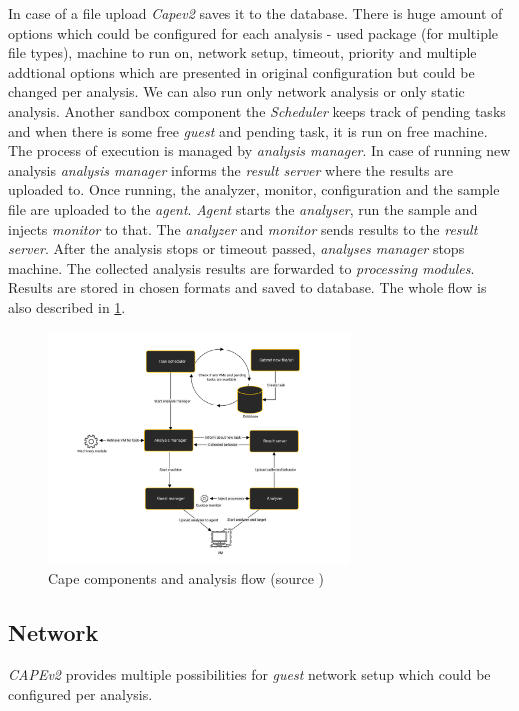 In case of a file upload \emph{Capev2} saves it to the database. There is huge amount of options which could be configured for each analysis - used package (for multiple file types), machine to run on, network setup, timeout, priority and multiple addtional options which are presented in original configuration but could be changed per analysis. We can also run only network analysis or only static analysis. Another sandbox component the \emph{Scheduler} keeps track of pending tasks and when there is some free \emph{guest} and pending task, it is run on free machine. The process of execution is managed by \emph{analysis manager}. In case of running new analysis \emph{analysis manager} informs the \emph{result server} where the results are uploaded to. Once running, the analyzer, monitor, configuration and the sample file are uploaded to the \emph{agent}. \emph{Agent} starts the \emph{analyser}, run the sample and injects \emph{monitor} to that. The \emph{analyzer} and \emph{monitor} sends results to the \emph{result server}. After the analysis stops or timeout passed, \emph{analyses manager} stops machine. The collected analysis results are forwarded to \emph{processing modules}. Results are stored in chosen formats and saved to database. \cite{CuckooSa10:online} The whole flow is also described in \ref{fig:capeflow}.

\begin{figure}[h]
  \centering
  \includegraphics[width=8cm]{figures/flow.svg}
  \caption{Cape components and analysis flow (source \cite{CuckooSa10:online})}
  \label{fig:capeflow}
\end{figure}


\subsection{Network}
\emph{CAPEv2} provides multiple possibilities for \emph{guest} network setup which could be configured per analysis. 

